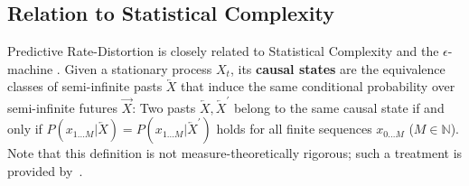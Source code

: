 \documentclass[entropy,article,submit,moreauthors,pdftex,10pt,a4paper]{Definitions/mdpi}
\newif \ifcomment
\newcommand\rljf[1]{\ifcomment{{\color{blue}(#1)}}\else{}\fi}
\newcommand{\future}{\overrightarrow{X}}
\newcommand{\past}{\overleftarrow{X}}
\newcommand{\key}{\textbf}
\begin{document}
%
%
%
%
%
%

\subsection{Relation to Statistical Complexity}\label{sec:complexity}

Predictive Rate-Distortion is closely related to Statistical Complexity and the $\epsilon$-machine \citep{crutchfield-inferring-1989,Grassberger1986}. %
Given a stationary process $X_t$, its \key{causal states} are the equivalence classes of semi-infinite pasts $\past$ that induce the same conditional probability over semi-infinite futures $\future$:
Two pasts $\past, \past^\prime$ belong to the same causal state if and only if $P(x_{1...M}|\past) = P(x_{1...M}|\past^\prime)$ holds for all finite sequences $x_{0...M}$ ($M \in \mathbb{N}$).
Note that this definition is not measure-theoretically rigorous; such a treatment is provided by~\citet{lohr-properties-2009}.
\end{document}

